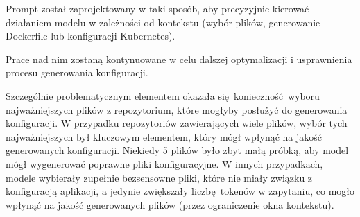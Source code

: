 Prompt został zaprojektowany w taki sposób, aby precyzyjnie kierować działaniem modelu w zależności od kontekstu (wybór plików, generowanie Dockerfile lub konfiguracji Kubernetes).

Prace nad nim zostaną kontynuowane w celu dalszej optymalizacji i usprawnienia procesu generowania konfiguracji.

Szczególnie problematycznym elementem okazała się konieczność wyboru najważniejszych plików z repozytorium, które mogłyby posłużyć do generowania konfiguracji. W przypadku repozytoriów zawierających wiele plików, wybór tych najważniejszych był kluczowym elementem, który mógł wpłynąć na jakość generowanych konfiguracji. Niekiedy 5 plików było zbyt małą próbką, aby model mógł wygenerować poprawne pliki konfiguracyjne. W innych przypadkach, modele wybierały zupełnie bezsensowne pliki, które nie miały związku z konfiguracją aplikacji, a jedynie zwiększały liczbę tokenów w zapytaniu, co mogło wpłynąć na jakość generowanych plików (przez ograniczenie okna kontekstu).